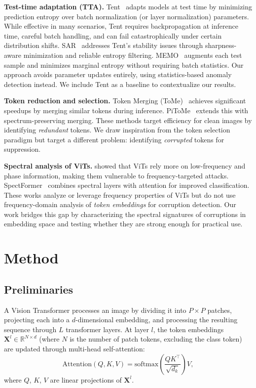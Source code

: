 \documentclass{article}
\begin{document}
\textbf{Test-time adaptation (TTA).} Tent~\citep{wang2021tent} adapts models at test time by minimizing prediction entropy over batch normalization (or layer normalization) parameters. While effective in many scenarios, Tent requires backpropagation at inference time, careful batch handling, and can fail catastrophically under certain distribution shifts. SAR~\citep{niu2023towards} addresses Tent's stability issues through sharpness-aware minimization and reliable entropy filtering. MEMO~\citep{zhang2022memo} augments each test sample and minimizes marginal entropy without requiring batch statistics. Our approach avoids parameter updates entirely, using statistics-based anomaly detection instead. We include Tent as a baseline to contextualize our results.

\textbf{Token reduction and selection.} Token Merging (ToMe)~\citep{bolya2023token} achieves significant speedups by merging similar tokens during inference. PiToMe~\citep{tran2024accelerating} extends this with spectrum-preserving merging. These methods target efficiency for clean images by identifying \emph{redundant} tokens. We draw inspiration from the token selection paradigm but target a different problem: identifying \emph{corrupted} tokens for suppression.

\textbf{Spectral analysis of ViTs.} \citet{kim2024exploring} showed that ViTs rely more on low-frequency and phase information, making them vulnerable to frequency-targeted attacks. SpectFormer~\citep{patro2025spectformer} combines spectral layers with attention for improved classification. These works analyze or leverage frequency properties of ViTs but do not use frequency-domain analysis of \emph{token embeddings} for corruption detection. Our work bridges this gap by characterizing the spectral signatures of corruptions in embedding space and testing whether they are strong enough for practical use.

\section{Method}
\label{sec:method}

\subsection{Preliminaries}

A Vision Transformer processes an image by dividing it into $P \times P$ patches, projecting each into a $d$-dimensional embedding, and processing the resulting sequence through $L$ transformer layers. At layer $l$, the token embeddings $\mathbf{X}^l \in \mathbb{R}^{N \times d}$ (where $N$ is the number of patch tokens, excluding the class token) are updated through multi-head self-attention:
\begin{equation}
\text{Attention}(Q, K, V) = \text{softmax}\left(\frac{QK^\top}{\sqrt{d_k}}\right) V,
\end{equation}
where $Q$, $K$, $V$ are linear projections of $\mathbf{X}^l$.
\end{document}
